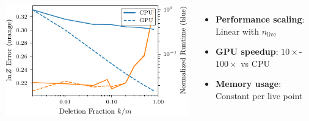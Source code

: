 \documentclass[aspectratio=169]{beamer}
\begin{document}
\begin{frame}
\begin{columns}
        \includegraphics[width=\textwidth]{figures/scaling}
        \vspace{10pt}
        \begin{itemize}
            \item \textbf{Performance scaling}: Linear with $n_{\text{live}}$
            \item \textbf{GPU speedup}: $10\times$-$100\times$ vs CPU
            \item \textbf{Memory usage}: Constant per live point
        \end{itemize}
    \end{columns}
\end{frame}
\end{document}
